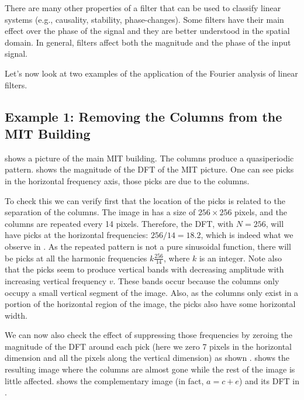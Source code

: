 There are many other properties of a filter that can be used to classify linear systems (e.g., causality, stability, phase-changes). Some filters have their main effect over the phase of the signal and they are better understood in the spatial domain. In general, filters affect both the magnitude and the phase of the input signal.

%
%
%
%




Let's now look at two examples of the application of the Fourier analysis of linear filters.  


\subsection{Example 1: Removing the Columns from the MIT Building}

 shows a picture of the main MIT building. The columns produce a quasiperiodic pattern.  shows the magnitude of the DFT of the MIT picture. One can see picks in the horizontal frequency axis, those picks are due to the columns. 

To check this we can verify first that the location of the picks is related to the separation of the columns. The image in  has a size of $256\times256$ pixels, and the columns are repeated every 14 pixels. Therefore, the DFT, with $N=256$, will have picks at the horizontal frequencies: $256/14=18.2$, which is indeed what we observe in . As the repeated pattern is not a pure sinusoidal function, there will be picks at all the harmonic frequencies $k\frac{256}{14}$, where $k$ is an integer. Note also that the picks seem to produce vertical bands with decreasing amplitude with increasing vertical frequency $v$. These bands occur because the columns only occupy a small vertical segment of the image. Also, as the columns only exist in a portion of the horizontal region of the image, the picks also have some horizontal width. 

We can now also check the effect of suppressing those frequencies by zeroing the magnitude of the DFT around each pick (here we zero 7 pixels in the horizontal dimension and all the pixels along the vertical dimension) as shown .  shows the resulting image where the columns are almost gone while the rest of the image is little affected.  shows the complementary image (in fact, $a=c+e$) and its DFT in .


